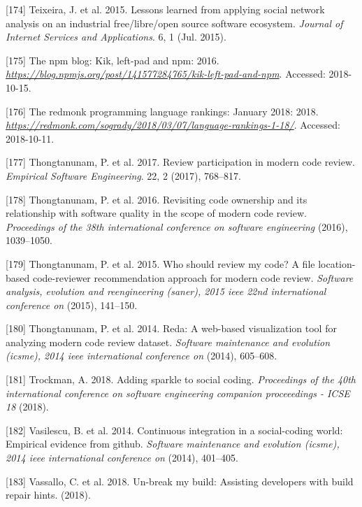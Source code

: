 \documentclass[]{book}
\begin{document}
\hypertarget{ref-Teixeira2015}{}
{[}174{]} Teixeira, J. et al. 2015. Lessons learned from applying social
network analysis on an industrial free/libre/open source software
ecosystem. \emph{Journal of Internet Services and Applications}. 6, 1
(Jul. 2015).

\hypertarget{ref-NPM2016}{}
{[}175{]} The npm blog: Kik, left-pad and npm: 2016.
\emph{\url{https://blog.npmjs.org/post/141577284765/kik-left-pad-and-npm}}.
Accessed: 2018-10-15.

\hypertarget{ref-RedMonk2018}{}
{[}176{]} The redmonk programming language rankings: January 2018: 2018.
\emph{\url{https://redmonk.com/sogrady/2018/03/07/language-rankings-1-18/}}.
Accessed: 2018-10-11.

\hypertarget{ref-thongtanunam2017review}{}
{[}177{]} Thongtanunam, P. et al. 2017. Review participation in modern
code review. \emph{Empirical Software Engineering}. 22, 2 (2017),
768--817.

\hypertarget{ref-thongtanunam2016revisiting}{}
{[}178{]} Thongtanunam, P. et al. 2016. Revisiting code ownership and
its relationship with software quality in the scope of modern code
review. \emph{Proceedings of the 38th international conference on
software engineering} (2016), 1039--1050.

\hypertarget{ref-thongtanunam2015should}{}
{[}179{]} Thongtanunam, P. et al. 2015. Who should review my code? A
file location-based code-reviewer recommendation approach for modern
code review. \emph{Software analysis, evolution and reengineering
(saner), 2015 ieee 22nd international conference on} (2015), 141--150.

\hypertarget{ref-thongtanunam2014reda}{}
{[}180{]} Thongtanunam, P. et al. 2014. Reda: A web-based visualization
tool for analyzing modern code review dataset. \emph{Software
maintenance and evolution (icsme), 2014 ieee international conference
on} (2014), 605--608.

\hypertarget{ref-Trockman2018}{}
{[}181{]} Trockman, A. 2018. Adding sparkle to social coding.
\emph{Proceedings of the 40th international conference on software
engineering companion proceeedings - ICSE 18} (2018).

\hypertarget{ref-vasilescu2014continuous}{}
{[}182{]} Vasilescu, B. et al. 2014. Continuous integration in a
social-coding world: Empirical evidence from github. \emph{Software
maintenance and evolution (icsme), 2014 ieee international conference
on} (2014), 401--405.

\hypertarget{ref-vassallo2018break}{}
{[}183{]} Vassallo, C. et al. 2018. Un-break my build: Assisting
developers with build repair hints. (2018).
\end{document}
